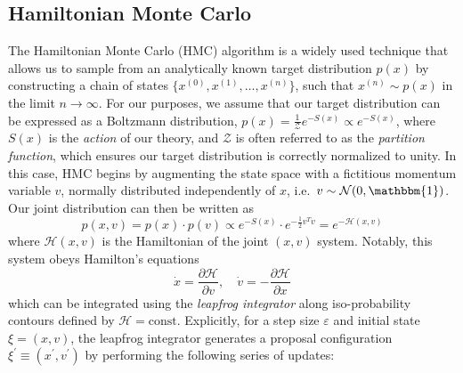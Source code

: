 \documentclass{article} %
\begin{document}
\subsection{\label{subsec:HMC}Hamiltonian Monte Carlo}
%
The Hamiltonian Monte Carlo (HMC) algorithm is a widely used technique that allows us to sample from an analytically
known target distribution \(p(x)\) by constructing a chain of states \(\{x^{(0)},
x^{(1)}, \ldots, x^{(n)}\}\), such that \(x^{(n)}\sim p(x)\) in the limit
\(n\rightarrow\infty\).
%
For our purposes, we assume that our target distribution can be expressed as a Boltzmann distribution, \(p(x) =
\tfrac{1}{\mathcal{Z}} e^{-S(x)}\propto e^{-S(x)}\), where \(S(x)\) is the \emph{action} of our
theory, and \(\mathcal{Z}\) is often referred to as the \emph{partition function}, which ensures our target distribution
is correctly normalized to unity.
%
In this case, HMC begins by augmenting the state space with a fictitious momentum variable \(v\), normally
distributed independently of \(x\), i.e.\ \(v\sim\mathcal{N}(0, \mathbbm{1})\).
%
Our joint distribution can then be written as
%
\begin{equation}
   p(x, v) = p(x)\cdot p(v) \propto e^{-S(x)}\cdot e^{-\frac{1}{2}v^{T}v} = e^{-\mathcal{H}(x, v)}
\end{equation}
%
where \(\mathcal{H}(x, v)\) is the Hamiltonian of the joint \((x, v)\) system.
%
Notably, this system obeys Hamilton's equations
%
\begin{equation}
   \dot{x} = \frac{\partial\mathcal{H}}{\partial v},\quad \dot{v} = -\frac{\partial\mathcal{H}}{\partial x}
\end{equation}
%
which can be integrated using the \emph{leapfrog integrator} along iso-probability contours defined by \(\mathcal{H} =
\text{const}\).
%
Explicitly, for a step size \(\varepsilon\) and initial state \(\xi = (x, v)\), the leapfrog integrator generates a
proposal configuration \(\xi^{\prime} \equiv (x^{\prime}, v^{\prime})\) by performing the following series of updates: 
%
\end{document}
